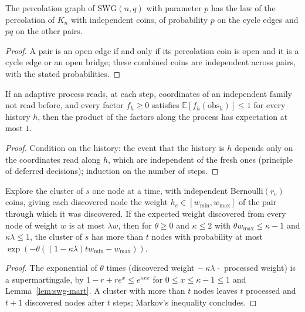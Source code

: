 \begin{lemma}\label{lem:swg-collapse}
\leanok{}
The percolation graph of $\mathrm{SWG}(n, q)$ with parameter $p$ has the law of the percolation of
$K_n$ with independent coins, of probability $p$ on the cycle edges and $pq$ on the other pairs.
\end{lemma}
\begin{proof}\leanok
A pair is an open edge if and only if its percolation coin is open and it is a cycle edge or an
open bridge; these combined coins are independent across pairs, with the stated probabilities.
\end{proof}

\begin{lemma}\label{lem:swg-mart}
\leanok
If an adaptive process reads, at each step, coordinates of an independent family not read before,
and every factor $f_h \ge 0$ satisfies $\mathbb E[f_h(\mathrm{obs}_h)] \le 1$ for every history $h$,
then the product of the factors along the process has expectation at most $1$.
\end{lemma}
\begin{proof}\leanok
Condition on the history: the event that the history is $h$ depends only on the coordinates read
along $h$, which are independent of the fresh ones (principle of deferred decisions); induction on
the number of steps.
\end{proof}

\begin{theorem}\label{thm:swg-explore}
\leanok{}
Explore the cluster of $s$ one node at a time, with independent Bernoulli$(r_e)$ coins, giving
each discovered node the weight $h_e \in [w_{\min}, w_{\max}]$ of the pair through which it was
discovered. If the expected weight discovered from every node of weight $w$ is at most $\lambda w$,
then for $\theta \ge 0$ and $\kappa \le 2$ with $\theta w_{\max} \le \kappa - 1$ and $\kappa\lambda
\le 1$, the cluster of $s$ has more than $t$ nodes with probability at most
$\exp(-\theta((1-\kappa\lambda) t w_{\min} - w_{\max}))$.
\end{theorem}
\begin{proof}\leanok
The exponential of $\theta$ times (discovered weight $-\ \kappa\lambda\,\cdot$ processed weight) is
a supermartingale, by $1 - r + r e^x \le e^{\kappa r x}$ for $0 \le x \le \kappa - 1 \le 1$ and
Lemma~\ref{lem:swg-mart}. A cluster with more than $t$ nodes leaves $t$ processed and $t + 1$
discovered nodes after $t$ steps; Markov's inequality concludes.
\end{proof}


